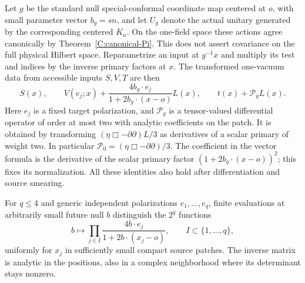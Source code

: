 Let $g$ be the standard null special-conformal coordinate map centered at
$o$, with small parameter vector $b_g=sn$, and let $U_g$ denote the actual
unitary generated by the corresponding centered $K_n$.  On the
one-field space these actions agree canonically by
Theorem~\ref{C:canonical-Pi}.  This does not assert covariance on the
full physical Hilbert space.  Reparametrize an input at $g^{-1}x$ and
multiply its test and indices by the inverse primary factors at $x$.
The transformed one-vacuum data from accessible inputs $S,V,T$ are then
\begin{equation}
 S(x),\qquad
 V(e_j;x)+\frac{4b_g\cdot e_j}{1+2b_g\cdot(x-o)}L(x),\qquad
 t(x)+\mathcal P_g L(x).
 \label{P:transformed-data}
\end{equation}
Here $e_j$ is a fixed target polarization, and $\mathcal P_g$ is a
tensor-valued differential operator of order at most two with analytic
coefficients on the patch.  It is obtained by transforming
$(\eta\Box-\partial\partial)L/3$ as derivatives of a scalar primary of
weight two.  In particular
$\mathcal P_0=(\eta\Box-\partial\partial)/3$.
The coefficient in the vector formula is the derivative of the scalar
primary factor $(1+2b_g\cdot(x-o))^2$; this fixes its normalization.
All these identities also hold after differentiation and source
smearing.

\begin{lemma}
\label{P:interpolation}
For $q\leq4$ and generic independent polarizations $e_1,\ldots,e_q$,
finite evaluations at arbitrarily small future null $b$ distinguish the
$2^q$ functions
\begin{equation}
 b\longmapsto\prod_{j\in I}
       \frac{4b\cdot e_j}{1+2b\cdot(x_j-o)},
 \qquad I\subset\{1,\ldots,q\},
 \label{P:interpolation-functions}
\end{equation}
uniformly for $x_j$ in sufficiently small compact source patches.
The inverse matrix is analytic in the positions, also in a complex
neighborhood where its determinant stays nonzero.
\end{lemma}

